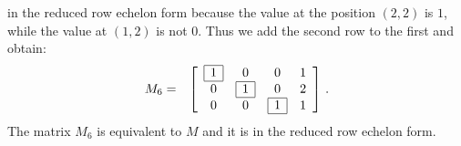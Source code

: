 in the reduced row echelon form because the value at the position \( (2,2) \) is \( 1 \), while the value at \( (1,2) \) is not \( 0 \). Thus we add the second row to the first and obtain: \begin{eqnarray*}M_6&=&\left[\begin{array}{cccc}\begin{array}{|c|}\hline 1\\\hline\end{array}&0&0&1\\ 0&\begin{array}{|c|}\hline 1\\\hline\end{array}&0&2\\ 0&0&\begin{array}{|c|}\hline 1\\\hline\end{array}&1\end{array}\right]\,. \end{eqnarray*} The matrix \( M_6 \) is equivalent to \( M \) and it is in the reduced row echelon form.
